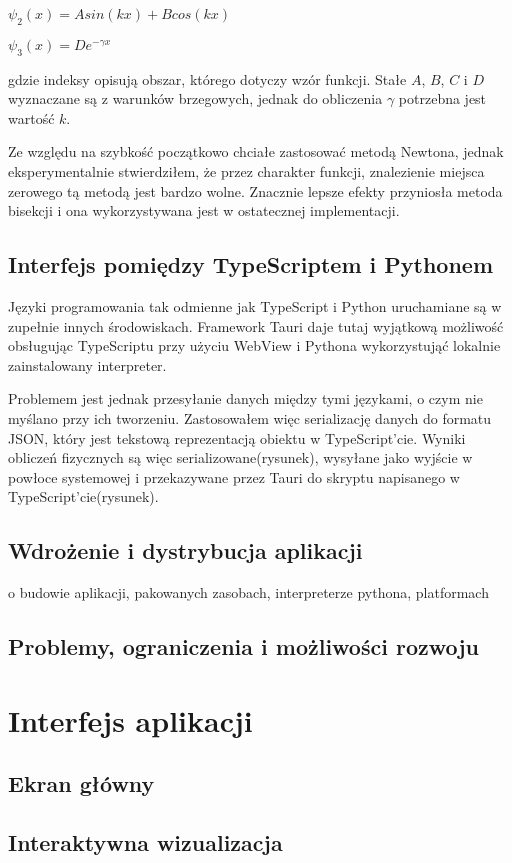 \documentclass{SGGW-thesis}
\begin{document}
		$\psi_2(x) = Asin(kx) + Bcos(kx)$
		
		$\psi_3(x) = De^{-\gamma x}$

gdzie indeksy opisują obszar, którego dotyczy wzór funkcji.
		Stałe $A$, $B$, $C$ i $D$ wyznaczane są z warunków brzegowych, jednak do obliczenia $\gamma$ potrzebna jest wartość $k$.
		
		Ze względu na szybkość początkowo chciałe zastosować metodą Newtona, jednak eksperymentalnie stwierdziłem, że przez charakter funkcji, znalezienie miejsca zerowego tą metodą jest bardzo wolne. Znacznie lepsze efekty przyniosła metoda bisekcji i ona wykorzystywana jest w ostatecznej implementacji.
		
		
	\section{Interfejs pomiędzy TypeScriptem i Pythonem}
		Języki programowania tak odmienne jak TypeScript i Python uruchamiane są w zupełnie innych środowiskach. Framework Tauri daje tutaj wyjątkową możliwość obsługując TypeScriptu przy użyciu WebView\cite{tauri webview} i Pythona wykorzystująć lokalnie zainstalowany interpreter\cite{tauri shell}.
		
		Problemem jest jednak przesyłanie danych między tymi językami, o czym nie myślano przy ich tworzeniu. Zastosowałem więc serializację danych do formatu JSON, który jest tekstową reprezentacją obiektu w TypeScript'cie. Wyniki obliczeń fizycznych są więc serializowane(rysunek), wysyłane jako wyjście w powłoce systemowej i przekazywane przez Tauri do skryptu napisanego w TypeScript'cie(rysunek).  
	\section{Wdrożenie i dystrybucja aplikacji}
	o budowie aplikacji, pakowanych zasobach, interpreterze pythona, platformach
	\section{Problemy, ograniczenia i możliwości rozwoju}

\chapter{Interfejs aplikacji}
	\section{Ekran główny}
	\section{Interaktywna wizualizacja}
\end{document}
